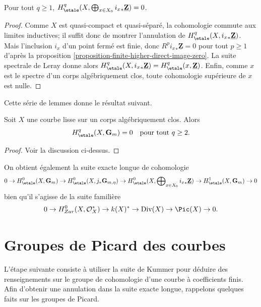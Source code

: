 \begin{lemma}
\label{lemma-cohomology-istar-Z}
Pour tout $q \geq 1$, $H_\etale^q(X, \bigoplus_{x \in X_0} {i_x}_*
\underline{\mathbf{Z}}) = 0$.
\end{lemma}

\begin{proof}
Comme $X$ est quasi-compact et quasi-séparé, la cohomologie commute aux limites inductives;
il suffit donc de montrer l'annulation de $H_\etale^q(X, {i_x}_*
\underline{\mathbf{Z}})$. Mais l'inclusion $i_x$ d'un point fermé est
finie, donc $R^p {i_x}_* \underline{\mathbf{Z}} = 0$ pour tout $p \geq 1$ d'après la
proposition \ref{proposition-finite-higher-direct-image-zero}.
La suite spectrale de Leray donne alors
$H_\etale^q(X, {i_x}_* \underline{\mathbf{Z}}) =
H_\etale^q(x, \underline{\mathbf{Z}})$.
Enfin, comme $x$ est le spectre d'un
corps algébriquement clos, toute cohomologie supérieure de $x$ est nulle.
\end{proof}

\noindent
Cette série de lemmes donne le résultat suivant.

\begin{theorem}
\label{theorem-vanishing-cohomology-Gm-curve}
Soit $X$ une courbe lisse sur un corps algébriquement clos. Alors
$$
H_\etale^q(X, \mathbf{G}_m) = 0 \ \ \text{ pour tout } q \geq 2.
$$
\end{theorem}

\begin{proof}
Voir la discussion ci-dessus.
\end{proof}

\noindent
On obtient également la suite exacte longue de cohomologie
$$
0 \to
H_\etale^0(X, \mathbf{G}_m) \to
H_\etale^0(X, j_*\mathbf{G}_{m, \eta}) \to
H_\etale^0(X, \bigoplus\nolimits_{x \in X_0} {i_x}_*\underline{\mathbf{Z}}) \to
H_\etale^1(X, \mathbf{G}_m) \to 0
$$
bien qu'il s'agisse de la suite familière
$$
0 \to H_{Zar}^0(X, \mathcal{O}_X^*) \to k(X)^* \to \text{Div}(X)
\to \Pic(X) \to 0.
$$





\section{Groupes de Picard des courbes}
\label{section-pic-curves}

\noindent
L'étape suivante consiste à utiliser la suite de Kummer pour déduire des renseignements
sur le groupe de cohomologie d'une courbe à coefficients finis. Afin
d'obtenir une annulation dans la suite exacte longue, rappelons quelques faits sur les
groupes de Picard.

